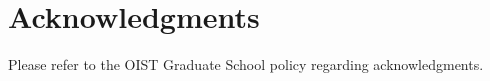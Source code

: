 \chapter*{Acknowledgments}

Please refer to the OIST Graduate School policy regarding acknowledgments.
